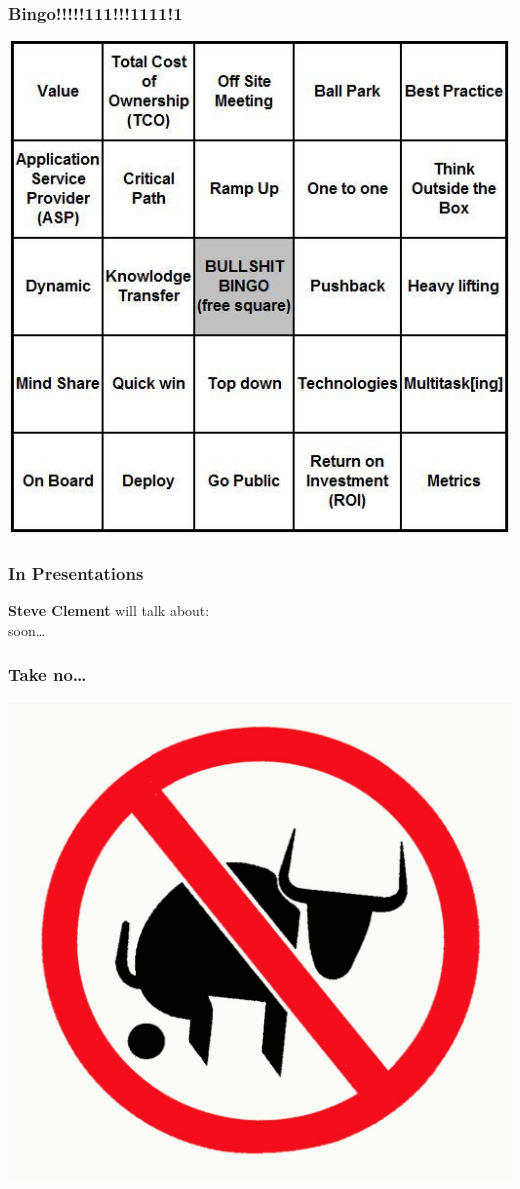 \documentclass[a4paper]{beamer}
\begin{document}
\begin{frame}
\frametitle{Bingo!!!!!111!!!1111!1} 
\includegraphics[scale=0.60]{img/bullshit20bingo1.jpg}
\end{frame}

\begin{frame}
\frametitle{In Presentations} 

{\bf Steve Clement} will talk about: 
\\
soon\ldots

\end{frame}

\begin{frame}
\frametitle{Take no\ldots} 
\includegraphics[scale=0.40]{img/01-no-bullshit.jpg}
\end{frame}
\end{document}

